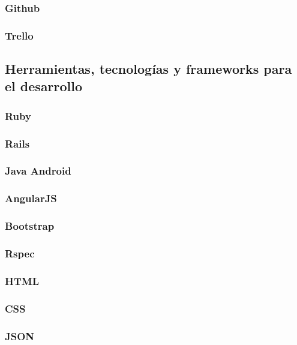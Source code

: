 		\subsubsection{Github}

		\subsubsection{Trello}
	
	\subsection{Herramientas, tecnologías y frameworks para el desarrollo}
		\subsubsection{Ruby}
		
		\subsubsection{Rails}
		
		\subsubsection{Java Android}
		
		\subsubsection{AngularJS}

		\subsubsection{Bootstrap}
		
		\subsubsection{Rspec}
		
		\subsubsection{HTML}
		
		\subsubsection{CSS}
		
		\subsubsection{JSON}
		
